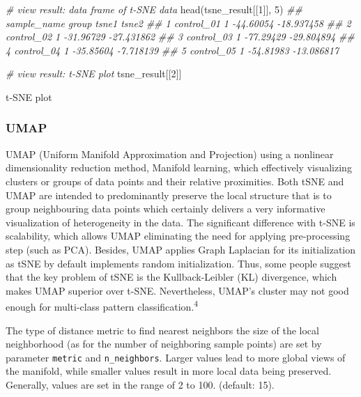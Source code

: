 \documentclass[]{article}
\newcommand{\hlnum}[1]{\textcolor[rgb]{0.816,0.125,0.439}{#1}}%
\newcommand{\hlcom}[1]{\textcolor[rgb]{0.502,0.502,0.502}{\textit{#1}}}%
\newcommand{\hlstd}[1]{\textcolor[rgb]{0.251,0.251,0.251}{#1}}%
\newcommand{\hlkwd}[1]{\textcolor[rgb]{0.878,0.439,0.125}{#1}}%
\newenvironment{Shaded}{\begin{myshaded}}{\end{myshaded}}
\newcommand{\KeywordTok}[1]{\hlkwd{#1}}
\newcommand{\DecValTok}[1]{\hlnum{#1}}
\newcommand{\CommentTok}[1]{\hlcom{#1}}
\newcommand{\NormalTok}[1]{\hlstd{#1}}
\begin{document}
\begin{Shaded}
\begin{Highlighting}[]
\CommentTok{# view result: data frame of t-SNE data}
\KeywordTok{head}\NormalTok{(tsne_result[[}\DecValTok{1}\NormalTok{]], }\DecValTok{5}\NormalTok{)}
\CommentTok{##   sample_name group     tsne1      tsne2}
\CommentTok{## 1  control_01     1 -44.60054 -18.937458}
\CommentTok{## 2  control_02     1 -31.96729 -27.431862}
\CommentTok{## 3  control_03     1 -77.29429 -29.804894}
\CommentTok{## 4  control_04     1 -35.85604  -7.718139}
\CommentTok{## 5  control_05     1 -54.81983 -13.086817}
\end{Highlighting}
\end{Shaded}

\begin{Shaded}
\begin{Highlighting}[]
\CommentTok{# view result: t-SNE plot}
\NormalTok{tsne_result[[}\DecValTok{2}\NormalTok{]] }
\end{Highlighting}
\end{Shaded}

\label{fig:unnamed-chunk-11}t-SNE plot

\hypertarget{UMAP}{%
\subsubsection{UMAP}\label{UMAP}}

UMAP (Uniform Manifold Approximation and Projection) using a nonlinear dimensionality reduction method, Manifold learning, which effectively visualizing clusters or groups of data points and their relative proximities. Both tSNE and UMAP are intended to predominantly preserve the local structure that is to group neighbouring data points which certainly delivers a very informative visualization of heterogeneity in the data. The significant difference with t-SNE is scalability, which allows UMAP eliminating the need for applying pre-processing step (such as PCA). Besides, UMAP applies Graph Laplacian for its initialization as tSNE by default implements random initialization. Thus, some people suggest that the key problem of tSNE is the Kullback-Leibler (KL) divergence, which makes UMAP superior over t-SNE. Nevertheless, UMAP's cluster may not good enough for multi-class pattern classification.\textsuperscript{4}

The type of distance metric to find nearest neighbors the size of the local neighborhood (as for the number of neighboring sample points) are set by parameter \texttt{metric} and \texttt{n\_neighbors}. Larger values lead to more global views of the manifold, while smaller values result in more local data being preserved. Generally, values are set in the range of 2 to 100. (default: 15).
\end{document}
